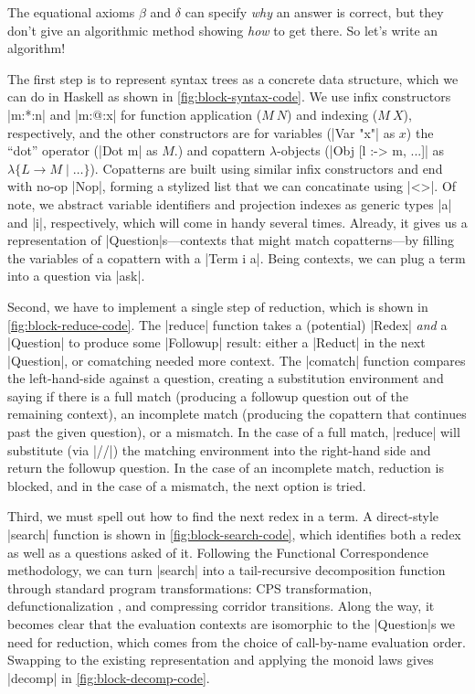 \documentclass[sigplan,screen]{acmart}
\begin{document}
The equational axioms $\beta$ and $\delta$ can specify \emph{why} an answer is
correct, but they don't give an algorithmic method showing \emph{how} to get
there.  So let's write an algorithm!

The first step is to represent syntax trees as a concrete data structure, which
we can do in Haskell as shown in \cref{fig:block-syntax-code}.  We use infix
constructors \hs|m:*:n| and \hs|m:@:x| for function application ($M~N$) and
indexing ($M~X$), respectively, and the other constructors are for variables
(\hs|Var "x"| as $x$) the ``dot'' operator (\hs|Dot m| as $M.$) and copattern
$\lambda$-objects (\hs|Obj [l :-> m, ...]| as $\lambda\{L \to M \mid \dots\}$).
Copatterns are built using similar infix constructors and end with no-op
\hs|Nop|, forming a stylized list that we can concatinate using \hs|<>|.  Of
note, we abstract variable identifiers and projection indexes as generic types
\hs|a| and \hs|i|, respectively, which will come in handy several times.  Already,
it gives us a representation of \hs|Question|s---contexts that might match
copatterns---by filling the variables of a copattern with a \hs|Term i a|.
Being contexts, we can plug a term into a question via \hs|ask|.

Second, we have to implement a single step of reduction, which is shown in
\cref{fig:block-reduce-code}.  The \hs|reduce| function takes a (potential)
\hs|Redex| \emph{and} a \hs|Question| to produce some \hs|Followup| result:
either a \hs|Reduct| in the next \hs|Question|, or comatching needed more
context.  The \hs|comatch| function compares the left-hand-side against a
question, creating a substitution environment and saying if there is a full
match (producing a followup question out of the remaining context), an
incomplete match (producing the copattern that continues past the given
question), or a mismatch.  In the case of a full match, \hs|reduce| will
substitute (via \hs|//|) the matching environment into the right-hand side and
return the followup question.  In the case of an incomplete match, reduction is
blocked, and in the case of a mismatch, the next option is tried.

Third, we must spell out how to find the next redex in a term.  A direct-style
\hs|search| function is shown in \cref{fig:block-search-code}, which identifies
both a redex as well as a questions asked of it.  Following the Functional
Correspondence methodology, we can turn \hs|search| into a tail-recursive
decomposition function through standard program transformations: CPS
transformation, defunctionalization \cite{DefinitionalInterpreters}, and
compressing corridor transitions.  Along the way, it becomes clear that the
evaluation contexts are isomorphic to the \hs|Question|s we need for reduction,
which comes from the choice of call-by-name evaluation order.  Swapping to the
existing representation and applying the monoid laws gives \hs|decomp| in
\cref{fig:block-decomp-code}.
\end{document}
